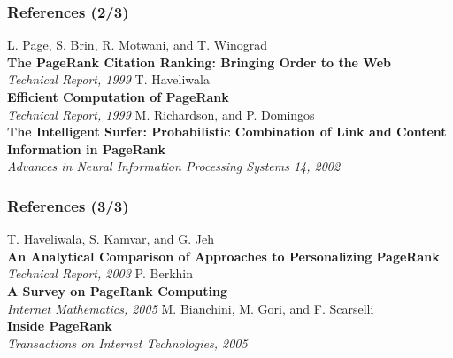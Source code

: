 \documentclass[10pt]{beamer}
\begin{document}
\begin{frame}
  \frametitle{References (2/3)}
  \begin{thebibliography}{1}
      L. Page, S. Brin, R. Motwani, and T. Winograd\\
      \textbf{The PageRank Citation Ranking: Bringing Order to the Web}\\
      \emph{Technical Report, 1999}
    	  T. Haveliwala\\
    	  \textbf{Efficient Computation of PageRank}\\
    	  \emph{Technical Report, 1999}
    	  M. Richardson, and P. Domingos\\
    	  \textbf{The Intelligent Surfer: Probabilistic Combination of Link and Content Information in PageRank}\\
    	  \emph{Advances in Neural Information Processing Systems 14, 2002}
  \end{thebibliography}
\end{frame}

\begin{frame}
  \frametitle{References (3/3)}
  \begin{thebibliography}{1}
      T. Haveliwala, S. Kamvar, and G. Jeh\\
    	  \textbf{An Analytical Comparison of Approaches to Personalizing PageRank}\\
    	  \emph{Technical Report, 2003}
    	  P. Berkhin\\
      \textbf{A Survey on PageRank Computing}\\
    	  \emph{Internet Mathematics, 2005}
      M. Bianchini, M. Gori, and F. Scarselli\\
      \textbf{Inside PageRank}\\
      \emph{Transactions on Internet Technologies, 2005}
  \end{thebibliography}
\end{frame}
\end{document}
